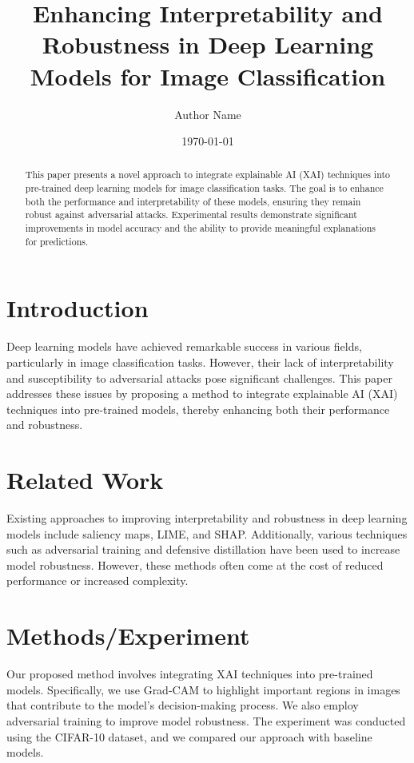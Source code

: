 \documentclass{article}
\title{Enhancing Interpretability and Robustness in Deep Learning Models for Image Classification}
\author{Author Name}
\date{\today}
\begin{document}
\maketitle

\begin{abstract}
This paper presents a novel approach to integrate explainable AI (XAI) techniques into pre-trained deep learning models for image classification tasks. The goal is to enhance both the performance and interpretability of these models, ensuring they remain robust against adversarial attacks. Experimental results demonstrate significant improvements in model accuracy and the ability to provide meaningful explanations for predictions.
\end{abstract}

\section{Introduction}
Deep learning models have achieved remarkable success in various fields, particularly in image classification tasks. However, their lack of interpretability and susceptibility to adversarial attacks pose significant challenges. This paper addresses these issues by proposing a method to integrate explainable AI (XAI) techniques into pre-trained models, thereby enhancing both their performance and robustness.

\section{Related Work}
Existing approaches to improving interpretability and robustness in deep learning models include saliency maps, LIME, and SHAP. Additionally, various techniques such as adversarial training and defensive distillation have been used to increase model robustness. However, these methods often come at the cost of reduced performance or increased complexity.

\section{Methods/Experiment}
Our proposed method involves integrating XAI techniques into pre-trained models. Specifically, we use Grad-CAM to highlight important regions in images that contribute to the model's decision-making process. We also employ adversarial training to improve model robustness. The experiment was conducted using the CIFAR-10 dataset, and we compared our approach with baseline models.
\end{document}
